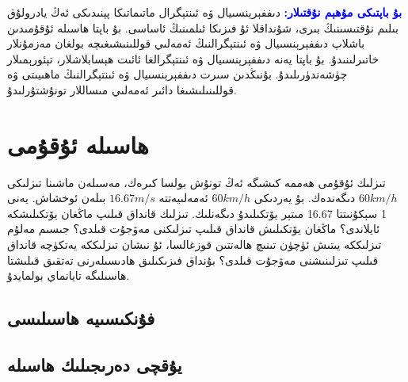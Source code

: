 \par\bigskip
\begin{tcolorbox}
	\textcolor{blue}{\textbf{بۇ باپتىكى مۇھېم نۇقتىلار:}}
دىففېرېنسىيال ۋە ئىنتېگرال ماتىماتىكا پېنىدىكى ئەڭ يادرولۇق بىلىم نۇقتىسىنىڭ بىرى، شۇنداقلا ئۇ فىزىكا ئىلمىنىڭ ئاساسى. بۇ باپتا ھاسىلە ئۇقۇمىدىن باشلاپ دىففېرېنسىيال ۋە ئىنتېگرالنىڭ ئەمەلىي قوللىنىشىغىچە بولغان مەزمۇنلار خاتىرلىنىدۇ. بۇ باپتا يەنە دىففېرېنسىيال ۋە ئىنتېگرالغا ئائىت ھېسابلاشلار، تېئورېمىلار چۈشەندۈرىلىدۇ. بۇنىڭدىن سىرت دىففېرېنسىيال ۋە ئىنتېگرالنىڭ ماھىيىتى ۋە قوللىنىلىشىغا دائىر ئەمەلىي مىساللار تونۇشتۇرلىدۇ.
\end{tcolorbox}

\section{ھاسىلە ئۇقۇمى}
تىزلىك ئۇقۇمى ھەممە كىشىگە ئەڭ تونۇش بولسا كىرەك، مەسىلەن ماشىنا تىزلىكى $60 km/h$ دىگەندەك. بۇ يەردىكى  $60 km/h$ ئەمەلىيەتتە  $16.67 m/s$ بىلەن ئوخشاش. يەنى 1 سېكۇنىتتا 16.67 مىتېر يۆتكىلىدۇ دىگەنلىك. تىزلىك قانداق قىلىپ ماڭغان يۆتكىلىشكە ئايلاندى؟ ماڭغان يۆتكىلىش قانداق قىلىپ تىزلىكنى مەۋجۇت قىلدى؟ جىسىم مەلۇم تىزلىككە يىتىش ئۈچۈن تىنىچ ھالەتتىن قوزغالسا، ئۇ نىشان تىزلىككە يەتكۈچە قانداق قىلىپ تىزلىنىشنى مەۋجۇت قىلدى؟ بۇنداق فىزىكىلىق ھادىسىلەرنى تەتقىق قىلىشتا ھاسىلىگە تايانماي بولمايدۇ.
\subsection{فۇنكىسىيە ھاسىلىسى}
\subsection{يۇقچى دەرىجىلىك ھاسىلە}

